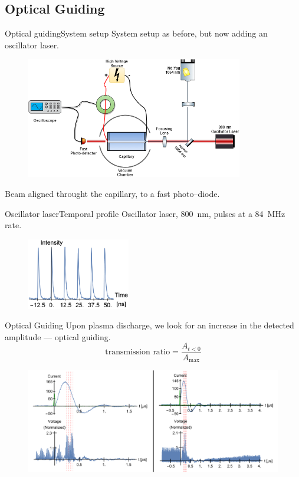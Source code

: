 \documentclass[dvipsnames]{beamer}
\begin{document}
\subsection{Optical Guiding}
 \begin{frame}{Optical guiding}{System setup}
   System setup as before, but now adding an oscillator laser.
   \begin{figure}
    \includegraphics[height=150pt]{figures/results/oscillator/oscillator_system_setup.png} 
   \end{figure}
   Beam aligned throught the capillary, to a fast photo--diode.
 \end{frame}
 \begin{frame}{Oscillator laser}{Temporal profile}
   Oscillator laser, \SI{800}{\nm}, pulses at a \SI{84}{\MHz} rate.
   \begin{figure}
     \includegraphics[width=0.4\textwidth]{figures/results/oscillator/single.PNG}
   \end{figure}
 \end{frame}
 \begin{frame}{Optical Guiding}
   Upon plasma discharge, we look for an increase in the detected amplitude --- optical guiding.
   \begin{equation*}
     \text{transmission ratio} = \frac{A_{t<0}}{A_\text{max}}
   \end{equation*}
   \begin{figure}
     \includegraphics[width=\textwidth]{figures/results/oscillator/guiding1.pdf}
   \end{figure}
 \end{frame}
\end{document}
